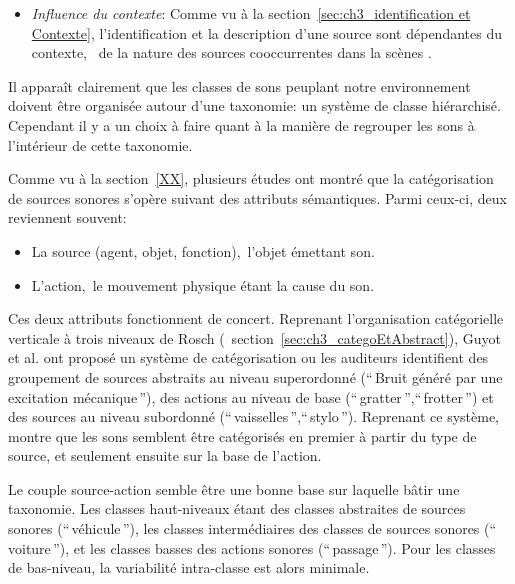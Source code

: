 \begin{itemize}
\begin{itemize}
\item \emph{Influence du contexte}: Comme vu à la section~\ref{sec:ch3_identification et Contexte}, l'identification et la description d'une source sont dépendantes du contexte, \ie~de la nature des sources cooccurrentes dans la scènes \citep{ballas1987interpreting,niessen2008disambiguating,gygi2011incongruency}.
\end{itemize}
\end{itemize}

Il apparaît clairement que les classes de sons peuplant notre environnement doivent être organisée autour d'une taxonomie: un système de classe hiérarchisé. Cependant il y a un choix à faire quant à la manière de regrouper les sons à l'intérieur de cette taxonomie.

Comme vu à la section~\ref{XX}, plusieurs études ont montré que la catégorisation de sources sonores s'opère suivant des attributs sémantiques. Parmi ceux-ci, deux reviennent souvent:

\begin{itemize}
\item La source (agent, objet, fonction),\ie~l'objet émettant son.
\item L'action,\ie~le mouvement physique étant la cause du son.
\end{itemize} 

Ces deux attributs fonctionnent de concert. Reprenant l'organisation catégorielle verticale à trois niveaux de Rosch (\cf~section~\ref{sec:ch3_categoEtAbstract}), Guyot et al. \citep{guyot1997} ont proposé un système de catégorisation ou les auditeurs identifient des groupement de sources abstraits au niveau superordonné (``\,Bruit généré par une excitation mécanique\,''), des actions au niveau de base (``\,gratter\,'',``\,frotter\,'') et des sources au niveau subordonné (``\,vaisselles\,'',``\,stylo\,''). Reprenant ce système, \citep{houix_lexical_2012} montre que les sons semblent être catégorisés en premier à partir du type de source, et seulement ensuite sur la base de l'action.


Le couple source-action semble être une bonne base sur laquelle bâtir une taxonomie. Les classes haut-niveaux étant des classes abstraites de sources sonores (``\,véhicule\,''), les classes intermédiaires des classes de sources sonores (``\,voiture\,''), et les classes basses des actions sonores (``\,passage\,''). Pour les classes de bas-niveau, la variabilité intra-classe est alors minimale.

